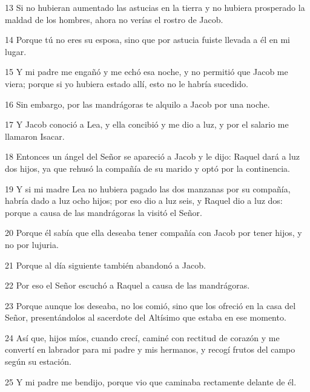 \par 13 Si no hubieran aumentado las astucias en la tierra y no hubiera prosperado la maldad de los hombres, ahora no verías el rostro de Jacob.

\par 14 Porque tú no eres su esposa, sino que por astucia fuiste llevada a él en mi lugar.

\par 15 Y mi padre me engañó y me echó esa noche, y no permitió que Jacob me viera; porque si yo hubiera estado allí, esto no le habría sucedido.

\par 16 Sin embargo, por las mandrágoras te alquilo a Jacob por una noche.

\par 17 Y Jacob conoció a Lea, y ella concibió y me dio a luz, y por el salario me llamaron Isacar.

\par 18 Entonces un ángel del Señor se apareció a Jacob y le dijo: Raquel dará a luz dos hijos, ya que rehusó la compañía de su marido y optó por la continencia.

\par 19 Y si mi madre Lea no hubiera pagado las dos manzanas por su compañía, habría dado a luz ocho hijos; por eso dio a luz seis, y Raquel dio a luz dos: porque a causa de las mandrágoras la visitó el Señor.

\par 20 Porque él sabía que ella deseaba tener compañía con Jacob por tener hijos, y no por lujuria.

\par 21 Porque al día siguiente también abandonó a Jacob.

\par 22 Por eso el Señor escuchó a Raquel a causa de las mandrágoras.

\par 23 Porque aunque los deseaba, no los comió, sino que los ofreció en la casa del Señor, presentándolos al sacerdote del Altísimo que estaba en ese momento.

\par 24 Así que, hijos míos, cuando crecí, caminé con rectitud de corazón y me convertí en labrador para mi padre y mis hermanos, y recogí frutos del campo según su estación.

\par 25 Y mi padre me bendijo, porque vio que caminaba rectamente delante de él.

